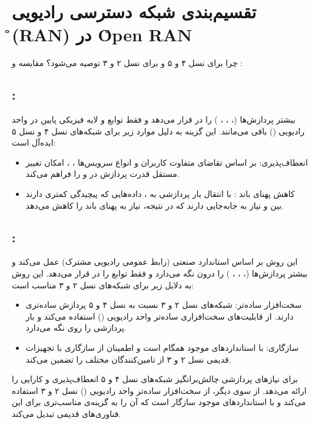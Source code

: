 \documentclass[landscape, 12pt]{report}
\begin{document}
\section*{
تقسیم‌بندی شبکه دسترسی رادیویی 
\r{(RAN)}
 در
 \r{Open RAN}
}
چرا  برای نسل ۴ و ۵ و  برای نسل ۲ و ۳ توصیه می‌شود؟
مقایسه  و :

\subsection*{ :}
بیشتر پردازش‌ها (، ، ، ) را در  قرار می‌دهد و فقط توابع  و لایه فیزیکی پایین در واحد رادیویی () باقی می‌مانند. این گزینه به دلیل موارد زیر برای شبکه‌های نسل ۴ و نسل ۵ ایده‌آل است:
\begin{itemize}
    \item انعطاف‌پذیری: بر اساس تقاضای متفاوت کاربران و انواع سرویس‌ها ، ،  امکان تغییر مستقل قدرت پردازش در  و  را فراهم می‌کند.
    \item کاهش پهنای باند : با انتقال بار پردازشی به ، داده‌هایی که پیچیدگی کمتری دارند بین  و  نیاز به جابه‌جایی دارند که در نتیجه، نیاز به پهنای باند  را کاهش می‌دهد.
\end{itemize}

\subsection*{ :}
این روش بر اساس استاندارد صنعتی  (رابط عمومی رادیویی مشترک) عمل می‌کند و بیشتر پردازش‌ها (، ، ، ) را درون  نگه می‌دارد و فقط توابع  را در  قرار می‌دهد. این روش به دلایل زیر برای شبکه‌های نسل ۲ و ۳ مناسب است:
\begin{itemize}
    \item سخت‌افزار ساده‌تر: شبکه‌های نسل ۲ و ۳ نسبت به نسل ۴ و ۵ پردازش ساده‌تری دارند.  از قابلیت‌های سخت‌افزاری ساده‌تر واحد رادیویی () استفاده می‌کند و بار پردازشی را روی  نگه می‌دارد.
    \item سازگاری:  با استانداردهای موجود  همگام است و اطمینان از سازگاری با تجهیزات قدیمی نسل ۲ و ۳ از تامین‌کنندگان مختلف را تضمین می‌کند.
\end{itemize}

 برای نیازهای پردازشی چالش‌برانگیز شبکه‌های نسل ۴ و ۵ انعطاف‌پذیری و کارایی را ارائه می‌دهد. از سوی دیگر،  از سخت‌افزار ساده‌تر واحد رادیویی () نسل ۲ و ۳ استفاده می‌کند و با استانداردهای موجود سازگار است که آن را به گزینه‌ی مناسب‌تری برای این فناوری‌های قدیمی تبدیل می‌کند.
\end{document}
